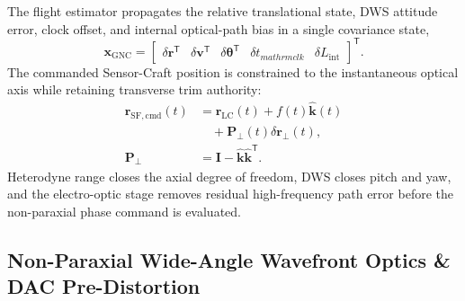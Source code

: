 \documentclass[10pt,twocolumn]{IEEEtran}
\begin{document}
The flight estimator propagates the relative translational state, DWS attitude
error, clock offset, and internal optical-path bias in a single covariance
state,
\begin{equation}
\bm x_{\mathrm{GNC}}=
\begin{bmatrix}
\delta\bm r^{\mathsf T} &
\delta\bm v^{\mathsf T} &
\delta\bm\theta^{\mathsf T} &
\delta t_{mathrm{clk}} &
\delta L_{\mathrm{int}}
\end{bmatrix}^{\mathsf T}.
\label{eq:gnc_estimator_state}
\end{equation}
The commanded Sensor-Craft position is constrained to the instantaneous
optical axis while retaining transverse trim authority:
\begin{equation}
\begin{aligned}
\bm r_{\mathrm{SF,cmd}}(t)
&=\bm r_{\mathrm{LC}}(t)+f(t)\widehat{\bm k}(t) \\
&\quad+\bm P_{\perp}(t)\delta\bm r_{\perp}(t), \\
\bm P_{\perp}
&=\bm I-\widehat{\bm k}\widehat{\bm k}^{\mathsf T}.
\end{aligned}
\label{eq:optical_axis_formation_command}
\end{equation}
Heterodyne range closes the axial degree of freedom, DWS closes pitch and yaw,
and the electro-optic stage removes residual high-frequency path error before
the non-paraxial phase command is evaluated.

\subsection{Non-Paraxial Wide-Angle Wavefront Optics \& DAC Pre-Distortion}
\label{sec:nonparaxial_steering}
\end{document}
